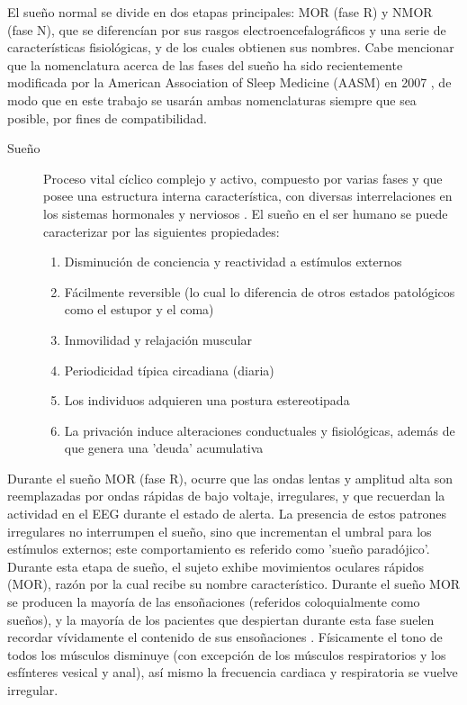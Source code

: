\documentclass[12pt,a4paper]{mitthesis}
\begin{document}
El sue\~no normal se divide en dos etapas principales: MOR (fase R) y NMOR (fase N), que se 
diferenc\'ian por sus rasgos electroencefalogr\'aficos y una serie de caracter\'isticas 
fisiol\'ogicas, y de los cuales obtienen sus nombres.
Cabe mencionar que la nomenclatura acerca de las fases del sue\~no ha sido recientemente modificada 
por la American Association of Sleep Medicine (AASM) en 2007 \cite{AASM07}, de modo que en este 
trabajo se  usar\'an ambas nomenclaturas siempre que sea posible, por fines de compatibilidad.

\begin{description}
\item[Sue\~no] Proceso vital c\'iclico complejo y activo, compuesto por varias fases y que posee 
una estructura interna caracter\'istica, con diversas interrelaciones en los sistemas hormonales y 
nerviosos \cite{FernandezConde07}.
El sue\~no en el ser humano se puede caracterizar por las siguientes propiedades\cite{CarrilloMora}:
\begin{enumerate}
\item Disminuci\'on de conciencia y reactividad a est\'imulos externos
\item F\'acilmente reversible (lo cual lo diferencia de otros estados 
patol\'ogicos como el estupor y el coma)
\item Inmovilidad y relajaci\'on muscular
\item Periodicidad t\'ipica circadiana (diaria)
\item Los individuos adquieren una postura estereotipada
\item La privaci\'on induce alteraciones conductuales y 
fisiol\'ogicas, adem\'as de que genera una 'deuda' acumulativa
\end{enumerate}
\end{description}

Durante el sue\~no MOR (fase R), ocurre que las ondas lentas y amplitud alta son reemplazadas por 
ondas r\'apidas de bajo voltaje, irregulares, y que recuerdan la actividad en el EEG durante el 
estado de alerta.
La presencia de estos patrones irregulares no interrumpen el sue\~no, sino que incrementan el 
umbral para los est\'imulos externos; este comportamiento es referido como 'sue\~no parad\'ojico'.
Durante esta etapa de sue\~no, el sujeto exhibe movimientos oculares r\'apidos (MOR), raz\'on por 
la cual recibe su nombre caracter\'istico.
Durante el sue\~no MOR se producen la mayor\'ia de las enso\~naciones (referidos coloquialmente 
como sue\~nos), y la mayor\'ia de los pacientes que despiertan durante esta fase suelen recordar 
v\'ividamente el contenido de sus enso\~naciones \cite{Chokroverty09}.
F\'isicamente el tono de todos los m\'usculos disminuye (con excepción de los m\'usculos 
respiratorios y los esf\'interes vesical y anal), as\'i mismo la frecuencia cardiaca y respiratoria 
se vuelve irregular.
\end{document}
